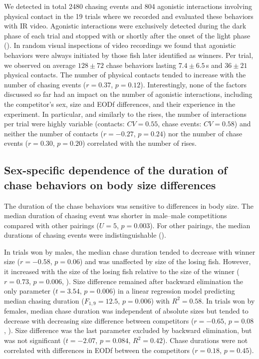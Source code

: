 We detected in total 2480 chasing events and 804 agonistic interactions involving physical contact in the 19 trials where we recorded and evaluated these behaviors with IR video. Agonistic interactions were exclusively detected during the dark phase of each trial and stopped with or shortly after the onset of the light phase (). In random visual inspections of video recordings we found that agonistic behaviors were always initiated by those fish later identified as winners. Per trial, we observed on average $128\pm 72$ chase behaviors lasting $7.4\pm 6.5$\,s and $36\pm 21$ physical contacts. The number of physical contacts tended to increase with the number of chasing events ($r=0.37$, $p=0.12$). Interestingly, none of the factors discussed so far had an impact on the number of agonistic interactions, including the competitor's sex, size and EODf differences, and their experience in the experiment. In particular, and similarly to the rises, the number of interactions per trial were highly variable (contacts: $CV=0.55$, chase events: $CV=0.58$) and neither the number of contacts ($r=-0.27$, $p=0.24$) nor the number of chase events ($r=0.30$, $p=0.20$) correlated with the number of rises.

\subsection{Sex-specific dependence of the duration of chase behaviors on body size differences}

The duration of the chase behaviors was sensitive to differences in body size. The median duration of chasing event was shorter in male--male competitions compared with other pairings ($U=5$, $p=0.003$). For other pairings, the median durations of chasing events were indistinguishable ().

In trials won by males, the median chase duration tended to decrease with winner size ($r=-0.58$, $p=0.06$) and was unaffected by size of the losing fish. However, it increased with the size of the losing fish relative to the size of the winner ($r=0.73$, $p=0.006$, ). Size difference remained after backward elimination the only parameter ($t=3.54$, $p=0.006$) in a linear regression model predicting median chasing duration ($F_{1,9}=12.5$, $p=0.006$) with $R^2 = 0.58$. In trials won by females, median chase duration was independent of absolute sizes but tended to decrease with decreasing size difference between competitors ($r=-0.65$, $p=0.08$, ). Size difference was the last parameter excluded by backward elimination, but was not significant ($t=-2.07$, $p=0.084$, $R^2=0.42$). Chase durations were not correlated with differences in EODf between the competitors ($r=0.18$, $p=0.45$).

